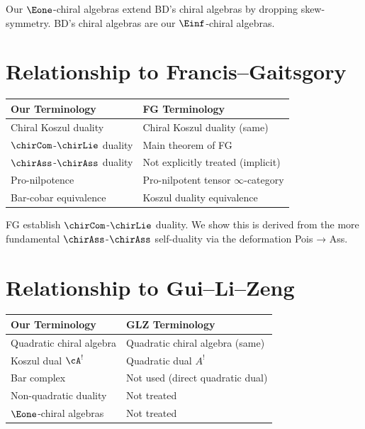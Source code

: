 \begin{remark}
Our $\Eone$-chiral algebras extend BD's chiral algebras by dropping skew-symmetry. BD's chiral algebras are our $\Einf$-chiral algebras.
\end{remark}

\section{Relationship to Francis--Gaitsgory}

\begin{tabular}{>{\raggedright\arraybackslash}p{}>{\raggedright\arraybackslash}p{}}
\textbf{Our Terminology} & \textbf{FG Terminology} \\
\hline
Chiral Koszul duality & Chiral Koszul duality (same) \\
$\chirCom$-$\chirLie$ duality & Main theorem of FG \\
$\chirAss$-$\chirAss$ duality & Not explicitly treated (implicit) \\
Pro-nilpotence & Pro-nilpotent tensor $\infty$-category \\
Bar-cobar equivalence & Koszul duality equivalence \\
\end{tabular}

\begin{remark}
FG establish $\chirCom$-$\chirLie$ duality. We show this is derived from the more fundamental $\chirAss$-$\chirAss$ self-duality via the deformation Pois → Ass.
\end{remark}

\section{Relationship to Gui--Li--Zeng}

\begin{tabular}{>{\raggedright\arraybackslash}p{}>{\raggedright\arraybackslash}p{}}
\textbf{Our Terminology} & \textbf{GLZ Terminology} \\
\hline
Quadratic chiral algebra & Quadratic chiral algebra (same) \\
Koszul dual $\cA^!$ & Quadratic dual $A^!$ \\
Bar complex & Not used (direct quadratic dual) \\
Non-quadratic duality & Not treated \\
$\Eone$-chiral algebras & Not treated \\
\end{tabular}

